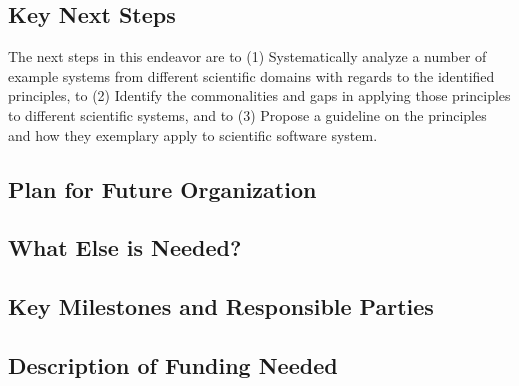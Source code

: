 \subsection{Key Next Steps}
The next steps in this endeavor are to (1) Systematically analyze a number of example systems from different scientific domains with regards to the identified principles, to (2) Identify the commonalities and gaps in applying those principles to different scientific systems, and to (3) Propose a guideline on the principles and how they exemplary apply to scientific software system.

\subsection{Plan for Future Organization}


\subsection{What Else is Needed?}


\subsection{Key Milestones and Responsible Parties}


\subsection{Description of Funding Needed}
